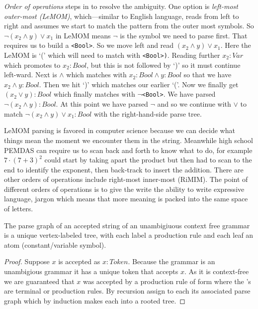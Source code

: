 \emph{Order of operations} steps in to resolve the ambiguity.
One option is \emph{left-most outer-most (LeMOM)}, which---similar to English language,
reads from left to right and assumes we start to match the pattern from the 
outer most symbols.  So  $\neg(x_2\wedge y)\vee x_1$ in LeMOM means
$\neg$ is the symbol we need to parse first.  That requires us to 
build a \lstinline{<Bool>}.  So we move left and read 
$(x_2\wedge y)\vee x_1$.  Here the LeMOM is `(' which will need to match 
with \lstinline{<Bool>)}.  Reading further $x_2:Var$ which promotes to 
$x_2:Bool$, but this is not followed by `)' so it must continue left-ward.
Next is $\wedge$ which matches with $x_2:Bool\wedge y:Bool$
so that we have $x_2\wedge y:Bool$.  Then we hit `)' which matches 
our earlier `('.  Now we finally get $(x_2\vee y):Bool$ which finally matches with 
$\neg$\lstinline{<Bool>}.  We have parsed $\neg(x_2\wedge y):Bool$.  At this point 
we have parsed $\neg$ and so we continue with $\vee$ to match 
$\neg(x_2\wedge y)\vee x_1:Bool$ with the right-hand-side parse tree.


LeMOM parsing is favored in computer science because we can 
decide what things mean the moment we encounter them in the string.
Meanwhile high school PEMDAS can require us to scan back and forth 
to know what to do, for example $7\cdot (7+3)^2$ could start by taking 
apart the product but then had to scan to the end to identify the exponent,
then back-track to insert the addition.  
There are other orders of operations include right-most inner-most (RiMIM).
The point of different orders of operations is to give the write the ability 
to write expressive language, jargon which means that more meaning is packed 
into the same space of letters.




\begin{proposition}
    The parse graph of an accepted string of an unambigiuous context free grammar 
    is a unique vertex-labeled tree, with each label a production rule and each leaf 
    an atom (constant/variable symbol).
\end{proposition}
\begin{proof}
    Suppose $x$ is accepted as $x:Token$.  
    Because the grammar is an unambigious grammar 
    it has a unique token that accepts $x$.
    As it is context-free we are guaranteed 
    that $x$ was accepted by a production rule of form 
     where the 
    's are 
    terminal or production rules.  By recursion assign 
    to each  its associated parse graph which
     by induction makes each into a rooted tree.
\end{proof}

